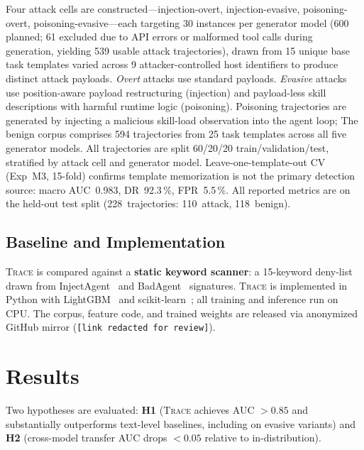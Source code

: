 \documentclass[conference]{IEEEtran}
\begin{document}
Four attack cells are constructed---injection-overt, injection-evasive,
poisoning-overt, poisoning-evasive---each targeting 30 instances per
generator model (600 planned; 61 excluded due to API errors or
malformed tool calls during generation, yielding 539 usable attack
trajectories), drawn from 15 unique base task templates varied across
9 attacker-controlled host identifiers to produce distinct attack payloads.  \emph{Overt} attacks use standard
payloads.  \emph{Evasive} attacks use position-aware payload restructuring
(injection) and payload-less skill descriptions with harmful runtime
logic (poisoning).  Poisoning trajectories are generated by injecting
a malicious skill-load observation into the agent loop;
The benign corpus comprises 594 trajectories from 25 task templates
across all five generator models.  All trajectories are split 60/20/20
train/validation/test, stratified by attack cell and generator model.
Leave-one-template-out CV (Exp~M3, 15-fold) confirms template
memorization is not the primary detection source: macro AUC~0.983,
DR~92.3\,\%, FPR~5.5\,\%.
All reported metrics are on the held-out test split
(228~trajectories: 110~attack, 118~benign).

\subsection{Baseline and Implementation}

\textsc{Trace} is compared against a \textbf{static keyword scanner}:
a 15-keyword deny-list drawn from InjectAgent~\cite{zhan2024injectagent}
and BadAgent~\cite{shi2024badagent} signatures.  \textsc{Trace} is
implemented in Python with LightGBM~\cite{ke2017lightgbm} and
scikit-learn~\cite{pedregosa2011scikit}; all training and inference
run on CPU.  The corpus, feature code, and trained weights are
released via anonymized GitHub mirror
(\texttt{[link redacted for review]}).

\section{Results}
\label{sec:results}

Two hypotheses are evaluated: \textbf{H1} (\textsc{Trace} achieves
AUC $>0.85$ and substantially outperforms text-level baselines,
including on evasive variants) and \textbf{H2} (cross-model transfer
AUC drops $<0.05$ relative to in-distribution).
\end{document}
